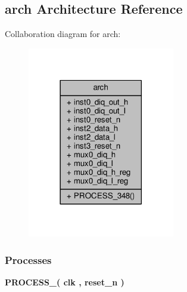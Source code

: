 \subsection{arch Architecture Reference}
\label{classdiq2fifo_1_1arch}


Collaboration diagram for arch\+:\nopagebreak
\begin{figure}[H]
\begin{center}
\leavevmode
\includegraphics[width=182pt]{d2/d6d/classdiq2fifo_1_1arch__coll__graph}
\end{center}
\end{figure}
\subsubsection*{Processes}
 \begin{DoxyCompactItemize}
\item 
{\bf P\+R\+O\+C\+E\+S\+S\+\_}{\bfseries  ( {\bfseries {\bfseries {\bf clk}} \textcolor{vhdlchar}{ }} , {\bfseries {\bfseries {\bf reset\+\_\+n}} \textcolor{vhdlchar}{ }} )}
\end{DoxyCompactItemize}
